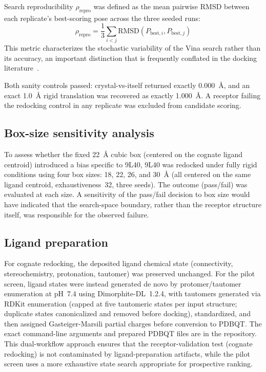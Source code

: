 \documentclass[global,twocolumn]{svjour}
\begin{document}
Search reproducibility $\rho_{\text{repro}}$ was defined as the mean pairwise
RMSD between each replicate's best-scoring pose across the three seeded runs:
\[
\rho_{\text{repro}} = \frac{1}{3} \sum_{i < j} \mathrm{RMSD}(P_{\text{best},i},
P_{\text{best},j})
\]
This metric characterizes the stochastic variability of the Vina search
rather than its accuracy, an important distinction that is frequently
conflated in the docking literature~\cite{thygesen2022}.

Both sanity controls passed: crystal-vs-itself returned exactly 0.000~\AA{},
and an exact 1.0~\AA{} rigid translation was recovered as exactly
1.000~\AA{}. A receptor failing the redocking control in any replicate was
excluded from candidate scoring.

\subsection{Box-size sensitivity analysis}

To assess whether the fixed 22~\AA{} cubic box (centered on the cognate
ligand centroid) introduced a bias specific to 9L40, 9L40 was redocked under
fully rigid conditions using four box sizes: 18, 22, 26, and 30~\AA{} (all
centered on the same ligand centroid, exhaustiveness~32, three seeds). The
outcome (pass/fail) was evaluated at each size. A sensitivity of the
pass/fail decision to box size would have indicated that the search-space
boundary, rather than the receptor structure itself, was responsible for the
observed failure.

\subsection{Ligand preparation}

For cognate redocking, the deposited ligand chemical state (connectivity,
stereochemistry, protonation, tautomer) was preserved unchanged. For the
pilot screen, ligand states were instead generated de novo by
protomer/tautomer enumeration at pH~7.4 using Dimorphite-DL~1.2.4, with
tautomers generated via RDKit enumeration (capped at five tautomeric states
per input structure; duplicate states canonicalized and removed before
docking), standardized, and then assigned Gasteiger-Marsili partial charges
before conversion to PDBQT. The exact command-line arguments and prepared
PDBQT files are in the repository. This dual-workflow approach ensures that
the receptor-validation test (cognate redocking) is not contaminated by
ligand-preparation artifacts, while the pilot screen uses a more exhaustive
state search appropriate for prospective ranking.
\end{document}
